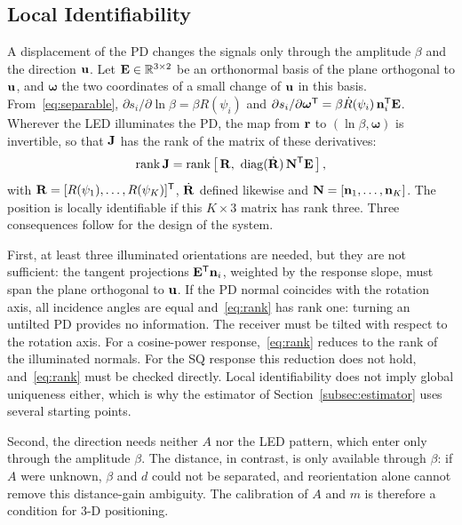 \subsection{Local Identifiability}
\label{subsec:identifiability}
A displacement of the PD changes the signals only through the amplitude $\beta$ and the direction $\mathbf{u}$. Let $\mathbf{E}\in\mathbb R^{3\times2}$ be an orthonormal basis of the plane orthogonal to $\mathbf{u}$, and $\bm\omega$ the two coordinates of a small change of $\mathbf{u}$ in this basis. From~\eqref{eq:separable}, $\partial s_i/\partial\ln\beta=\beta R(\psi_i)$ and $\partial s_i/\partial\bm\omega^{\mathsf T}=\beta\dot R(\psi_i)\,\mathbf{n}_i^{\mathsf T}\mathbf{E}$. Wherever the LED illuminates the PD, the map from $\mathbf{r}$ to $(\ln\beta,\bm\omega)$ is invertible, so that $\mathbf{J}$ has the rank of the matrix of these derivatives:
\begin{equation}
 \operatorname{rank}\mathbf{J}=\operatorname{rank}\left[\,\mathbf{R},\ \operatorname{diag}(\dot{\mathbf{R}})\,\mathbf{N}^{\mathsf T}\mathbf{E}\,\right],
 \label{eq:rank}
\end{equation}
with $\mathbf{R}=[R(\psi_1),\ldots,R(\psi_K)]^{\mathsf T}$, $\dot{\mathbf{R}}$ defined likewise and $\mathbf{N}=[\mathbf{n}_1,\ldots,\mathbf{n}_K]$. The position is locally identifiable if this $K\times3$ matrix has rank three. Three consequences follow for the design of the system.

First, at least three illuminated orientations are needed, but they are not sufficient: the tangent projections $\mathbf{E}^{\mathsf T}\mathbf{n}_i$, weighted by the response slope, must span the plane orthogonal to $\mathbf{u}$. If the PD normal coincides with the rotation axis, all incidence angles are equal and~\eqref{eq:rank} has rank one: turning an untilted PD provides no information. The receiver must be tilted with respect to the rotation axis. For a cosine-power response,~\eqref{eq:rank} reduces to the rank of the illuminated normals. For the SQ response this reduction does not hold, and~\eqref{eq:rank} must be checked directly. Local identifiability does not imply global uniqueness either, which is why the estimator of Section~\ref{subsec:estimator} uses several starting points.

Second, the direction needs neither $A$ nor the LED pattern, which enter only through the amplitude $\beta$. The distance, in contrast, is only available through $\beta$: if $A$ were unknown, $\beta$ and $d$ could not be separated, and reorientation alone cannot remove this distance-gain ambiguity. The calibration of $A$ and $m$ is therefore a condition for \mbox{3-D} positioning.

